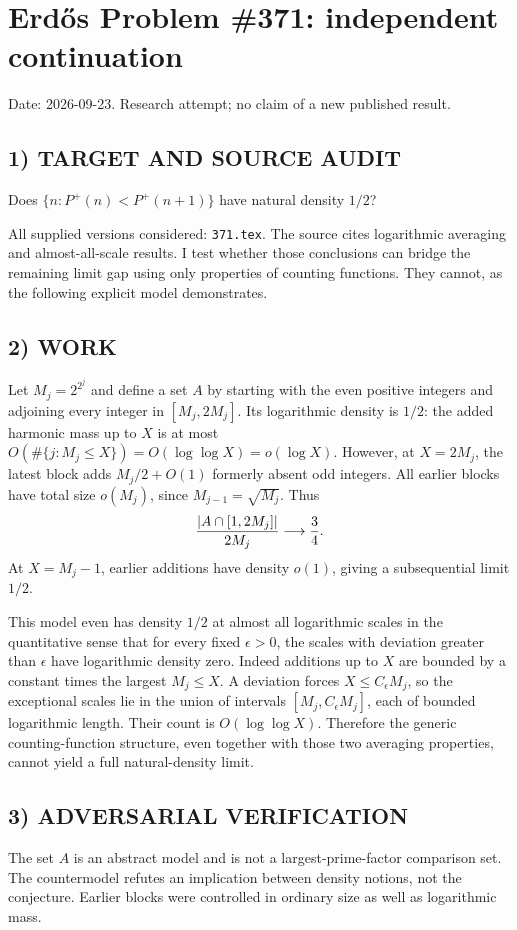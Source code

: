 \section{Erd\H{o}s Problem \#371: independent continuation}
\noindent Date: 2026-09-23. Research attempt; no claim of a new published result.
\subsection{1) TARGET AND SOURCE AUDIT}
Does $\{n:P^+(n)<P^+(n+1)\}$ have natural density $1/2$?

All supplied versions considered: \texttt{371.tex}.
The source cites logarithmic averaging and almost-all-scale results. I test whether those conclusions can bridge the remaining limit gap using only properties of counting functions. They cannot, as the following explicit model demonstrates.
\subsection{2) WORK}
Let $M_j=2^{2^j}$ and define a set $A$ by starting with the even positive integers and adjoining every integer in $[M_j,2M_j]$. Its logarithmic density is $1/2$: the added harmonic mass up to $X$ is at most $O(\#\{j:M_j\le X\})=O(\log\log X)=o(\log X)$.
However, at $X=2M_j$, the latest block adds $M_j/2+O(1)$ formerly absent odd integers. All earlier blocks have total size $o(M_j)$, since $M_{j-1}=\sqrt{M_j}$. Thus
\[
{|A\cap[1,2M_j]|\over2M_j}\longrightarrow\frac34.
\]
At $X=M_j-1$, earlier additions have density $o(1)$, giving a subsequential limit $1/2$.

This model even has density $1/2$ at almost all logarithmic scales in the quantitative sense that for every fixed $\epsilon>0$, the scales with deviation greater than $\epsilon$ have logarithmic density zero. Indeed additions up to $X$ are bounded by a constant times the largest $M_j\le X$. A deviation forces $X\le C_\epsilon M_j$, so the exceptional scales lie in the union of intervals $[M_j,C_\epsilon M_j]$, each of bounded logarithmic length. Their count is $O(\log\log X)$.
Therefore the generic counting-function structure, even together with those two averaging properties, cannot yield a full natural-density limit.
\subsection{3) ADVERSARIAL VERIFICATION}
The set $A$ is an abstract model and is not a largest-prime-factor comparison set. The countermodel refutes an implication between density notions, not the conjecture. Earlier blocks were controlled in ordinary size as well as logarithmic mass.
